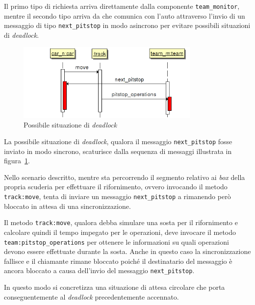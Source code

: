 Il primo tipo di richiesta arriva direttamente dalla componente \texttt{team\_monitor}, mentre il secondo tipo arriva da \team{} che comunica con l'auto attraverso l'invio di un messaggio di tipo \texttt{next\_pitstop} in modo asincrono per evitare possibili situazioni di \textit{deadlock}.

\begin{figure}
\includegraphics[width=0.8\textwidth]{diagrammi/PitstopDeadlock}
\caption{Possibile situazione di \textit{deadlock}}
\label{fig:pitstopDeadlock}
\end{figure}

La possibile situazione di \textit{deadlock}, qualora il messaggio \texttt{next\_pitstop} fosse inviato in modo sincrono, scaturisce dalla sequenza di messaggi illustrata in figura~\ref{fig:pitstopDeadlock}.

Nello scenario descritto, mentre \car{} sta percorrendo il segmento relativo ai \textit{box} della propria scuderia per effettuare il rifornimento, ovvero invocando il metodo \texttt{track:move}, \team{} tenta di inviare un messaggio \texttt{next\_pitstop} a \car{} rimanendo però bloccato in attesa di una sincronizzazione.

Il metodo \texttt{track:move}, qualora debba simulare una sosta per il rifornimento e calcolare quindi il tempo impegato per le operazioni, deve invocare il metodo \texttt{team:pitstop\_operations} per ottenere le informazioni su quali operazioni devono essere effettuate durante la sosta. Anche in questo caso la sincronizzazione fallisce e il chiamante rimane bloccato poiché il destinatario del messaggio è ancora bloccato a causa dell'invio del messaggio \texttt{next\_pitstop}.

In questo modo si concretizza una situazione di attesa circolare che porta conseguentemente al \textit{deadlock} precedentemente accennato.

